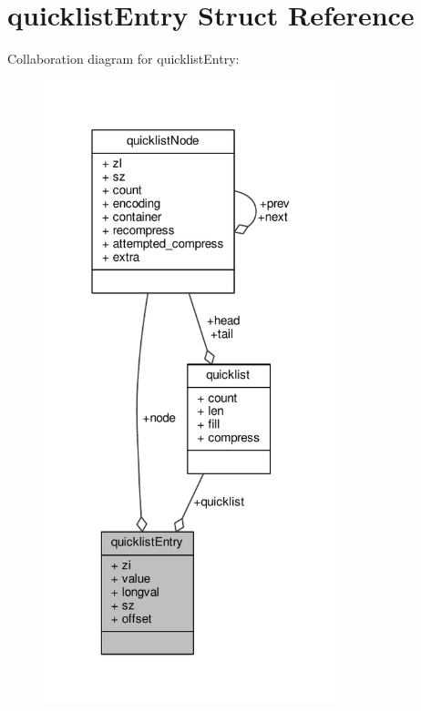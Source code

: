 \hypertarget{structquicklistEntry}{}\section{quicklist\+Entry Struct Reference}
\label{structquicklistEntry}


Collaboration diagram for quicklist\+Entry\+:\nopagebreak
\begin{figure}[H]
\begin{center}
\leavevmode
\includegraphics[width=243pt]{structquicklistEntry__coll__graph}
\end{center}
\end{figure}
